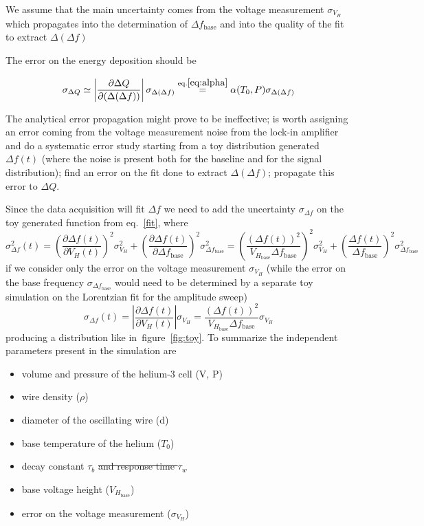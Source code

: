 \documentclass[a4paper,12pt]{article}
\begin{document}
We assume that the main uncertainty comes from the voltage measurement $\sigma_{V_H}$ which propagates into the determination of $\Delta f_\mathrm{base}$
and into the quality of the fit to extract $\Delta (\Delta f)$

The error on the energy deposition should be

\begin{equation}
  \sigma_{\Delta Q}  \simeq \left| \frac{\partial \Delta Q}{\partial(\Delta(\Delta f))} \right| \sigma_{\Delta (\Delta f)} \overset{\mathrm{eq. \ref{eq:alpha}}}{=} \alpha (T_0,P) \sigma_{\Delta (\Delta f)}
\end{equation}

The analytical error propagation might prove to be ineffective; is worth assigning an error coming from the voltage measurement noise from the lock-in amplifier and do a systematic error study starting from a toy distribution generated $\Delta f(t)$ (where the noise is present both for the baseline and for the signal distribution); find an error on the fit done to extract $\Delta (\Delta f)$; propagate this error to $\Delta Q$.

Since the data acquisition will fit $\Delta f$ we need to add the uncertainty $\sigma_{\Delta f}$ on the toy generated function from eq.~\ref{fit}, where
\begin{equation}
\sigma^2_{\Delta f}(t) = \left( \frac{\partial \Delta f(t)}{\partial V_H(t)} \right)^2 \sigma^2_{V_H} + \left( \frac{\partial \Delta f(t)}{\partial \Delta f_\mathrm{base}} \right)^2 \sigma^2_{\Delta f_\mathrm{base}} = \left( \frac{(\Delta f(t))^2}{V_{H_{\mathrm{base}}} \Delta f_\mathrm{base}} \right)^2 \sigma^2_{V_H} + \left( \frac{\Delta f(t)}{\Delta f_\mathrm{base}}\right)^2 \sigma^2_{\Delta f_\mathrm{base}}
\end{equation}
if we consider only the error on the voltage measurement $\sigma_{V_H}$ (while the error on the base frequency $\sigma_{\Delta f_\mathrm{base}}$ would need to be determined by a separate toy simulation on the Lorentzian fit for the amplitude sweep)
\begin{equation}
\sigma_{\Delta f}(t) = \left| \frac{\partial \Delta f(t)}{\partial V_H(t)} \right| \sigma_{V_H} = \frac{(\Delta f(t))^2}{V_{H_{\mathrm{base}}} \Delta f_\mathrm{base}} \sigma_{V_H}
\end{equation}
producing a distribution like in~figure~\ref{fig:toy}. To summarize the independent parameters present in the simulation are

\begin{itemize}
  \item volume and pressure of the helium-3 cell (V, P)
  \item wire density ($\rho$)
  \item diameter of the oscillating wire (d)
  \item base temperature of the helium ($T_0$)
  \item decay constant $\tau_b$ \st{and response time $\tau_w$}
  \item base voltage height ($V_{H_\mathrm{base}}$)
  \item error on the voltage measurement ($\sigma_{V_H}$)
\end{itemize}
\end{document}
